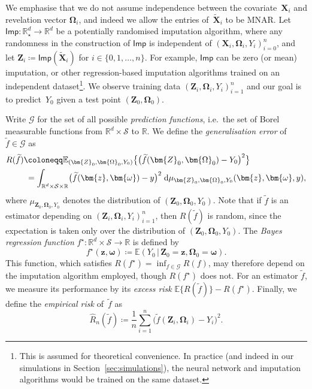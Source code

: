 \documentclass[12pt]{article}
\def\hat{\widehat}
\def\tilde{\widetilde}
\begin{document}
We emphasise that we do not assume independence between the covariate~$\bm{X}_i$ and revelation vector $\bm{\Omega}_i$, and indeed we allow the entries of~$\tilde{\bm{X}}_i$ to be MNAR. Let $\mathsf{Imp} : \mathbb{R}_{\star}^d \to \mathbb{R}^d$ be a potentially randomised imputation algorithm, where any randomness in the construction of $\mathsf{Imp}$ is independent of $(\bm{X}_i,\bm{\Omega}_i,Y_i)_{i=0}^{n}$, and let $\bm Z_i \coloneqq \mathsf{Imp}(\tilde{\bm X}_i)$ for $i\in\{0,1,\ldots,n\}$. For example, $\mathsf{Imp}$ can be zero (or mean) imputation, or other regression-based imputation algorithms trained on an independent dataset\footnote{This is assumed for theoretical convenience. In practice (and indeed in our simulations in Section~\ref{sec:simulations}), the neural network and imputation algorithms would be trained on the same dataset.}. We observe training data $(\bm{Z}_i,\bm{\Omega}_i,Y_i)_{i=1}^n$ and our goal is to predict~$Y_0$ given a test point $(\bm{Z}_0,\bm{\Omega}_0)$. %

Write $\mathcal{G}$ for the set of all possible \emph{prediction functions}, i.e.~the set of Borel measurable functions from $\mathbb{R}^d \times \mathcal{S}$ to $\mathbb{R}$.  We define the \emph{generalisation error} of $\tilde{f} \in \mathcal{G}$ as
\begin{align*}
    R(\tilde{f}) &\coloneqq \mathbb{E}_{(\bm{Z}_0,\bm{\Omega}_0,Y_0)} \bigl\{ \bigl(\tilde{f}(\bm{Z}_0,\bm{\Omega}_0) - Y_0\bigr)^2 \bigr\}\\
    &\hspace{0.09cm}= \int_{\mathbb{R}^d \times \mathcal{S} \times \mathbb{R}} \bigl(\tilde{f}(\bm{z},\bm{\omega}) - y\bigr)^2 \;\mathrm{d} \mu_{\bm{Z}_0,\bm{\Omega}_0,Y_0}(\bm{z},\bm{\omega},y),
\end{align*}
where $\mu_{\bm{Z}_0,\bm{\Omega}_0,Y_0}$ denotes the distribution of $(\bm{Z}_0,\bm{\Omega}_0,Y_0)$. Note that if $\tilde{f}$ is an estimator depending on $(\bm{Z}_i,\bm{\Omega}_i,Y_i)_{i=1}^n$, then $R(\tilde{f})$ is random, since the expectation is taken only over the distribution of $(\bm{Z}_0,\bm{\Omega}_0,Y_0)$.  The \emph{Bayes regression function} $f^{\star} : \mathbb{R}^d \times \mathcal{S} \to \mathbb{R}$ is defined by
\[
    f^{\star}(\bm{z}, \bm{\omega}) \coloneqq 
        \mathbb{E}(Y_0 \,|\, \bm{Z}_0=\bm{z}, \bm{\Omega}_0 = \bm{\omega}).
\]
This function, which satisfies $R(f^{\star}) = \inf_{f \in \mathcal{G}} R(f)$, may therefore depend on the imputation algorithm employed, though $R(f^{\star})$ does not.  For an estimator $\tilde{f}$, we measure its performance by its \emph{excess risk} $\mathbb{E}\bigl\{ R(\tilde{f})\bigr\} - R(f^{\star})$.  Finally, we define the \emph{empirical risk} of~$\tilde{f}$ as 
\[
\hat{R}_n(\tilde{f}) \coloneqq \frac{1}{n} \sum_{i=1}^n \bigl(\tilde{f}(\bm{Z}_i,\bm{\Omega}_i)-Y_i\bigr)^2.
\]
\end{document}
